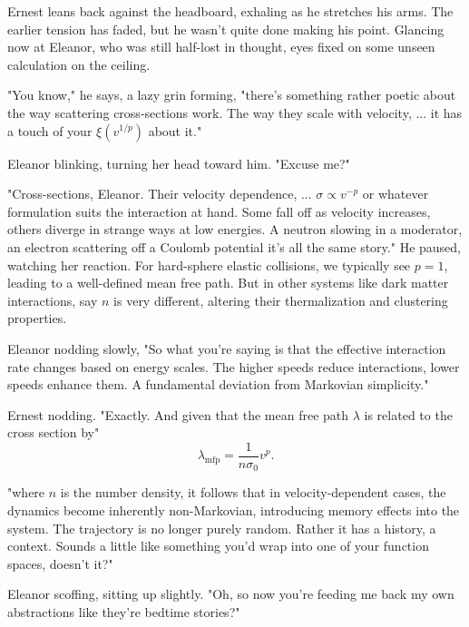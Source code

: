 Ernest leans back against the headboard, exhaling as he stretches his arms. The earlier tension has faded, but he wasn’t quite done making his point. Glancing now at Eleanor, who was still half-lost in thought, eyes fixed on some unseen calculation on the ceiling.

\bigskip

"You know," he says, a lazy grin forming, "there’s something rather poetic about the way scattering cross-sections work. The way they scale with velocity, ... it has a touch of your $\xi(v^{1/p})$ about it."

\bigskip

Eleanor blinking, turning her head toward him. "Excuse me?"

\bigskip

"Cross-sections, Eleanor. Their velocity dependence, ... $\sigma \propto v^{-p}$ or whatever formulation suits the interaction at hand. Some fall off as velocity increases, others diverge in strange ways at low energies. A neutron slowing in a moderator, an electron scattering off a Coulomb potential it’s all the same story." He paused, watching her reaction. For hard-sphere elastic collisions, we typically see $p = 1$, leading to a well-defined mean free path. But in other systems like dark matter interactions, say $n$ is very different, altering their thermalization and clustering properties.

\smallskip

Eleanor nodding slowly, "So what you're saying is that the effective interaction rate changes based on energy scales. The higher speeds reduce interactions, lower speeds enhance them. A fundamental deviation from Markovian simplicity."

Ernest nodding. "Exactly. And given that the mean free path $\lambda$ is related to the cross section by"
\begin{equation*}
    \lambda_{\text{mfp}} = \frac{1}{n \sigma_0} v^{p}.
\end{equation*}

"where $n$ is the number density, it follows that in velocity-dependent cases, the dynamics become inherently non-Markovian, introducing memory effects into the system. The trajectory is no longer purely random. Rather it has a history, a context. Sounds a little like something you’d wrap into one of your function spaces, doesn’t it?"

Eleanor scoffing, sitting up slightly. "Oh, so now you're feeding me back my own abstractions like they’re bedtime stories?"

